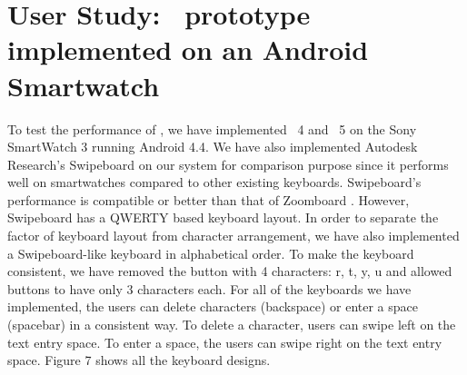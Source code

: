 \section{User Study: \papertitle\ prototype implemented on an Android Smartwatch}

To test the performance of \papertitle, we have implemented \papertitle\ 4 and \papertitle\ 5 on the Sony SmartWatch 3 running Android 4.4. We have also implemented Autodesk Research's Swipeboard on our system for comparison purpose since it performs well on smartwatches compared to other existing keyboards. Swipeboard's performance is compatible or better than that of Zoomboard \cite{swipeboard}. However, Swipeboard has a QWERTY based keyboard layout. In order to separate the factor of keyboard layout from character arrangement, we have also implemented a Swipeboard-like keyboard in alphabetical order. To make the keyboard consistent, we have removed the button with 4 characters: r, t, y, u and allowed buttons to have only 3 characters each. For all of the keyboards we have implemented, the users can delete characters (backspace) or enter a space (spacebar) in a consistent way. To delete a character, users can swipe left on the text entry space. To enter a space, the users can swipe right on the text entry space. Figure 7 shows all the keyboard designs.

